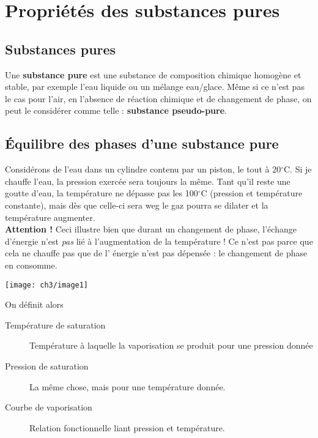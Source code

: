 \chapter{Propriétés des substances pures} 
\section{Substances pures}
Une \textbf{substance pure} est une substance de composition chimique 
homogène et stable, par exemple l'eau liquide ou un mélange eau/glace. 
Même si ce n'est pas le cas pour l'air, en l'absence de réaction 
chimique et de changement de phase, on peut le considérer comme telle 
: \textbf{substance pseudo-pure}.

\section{Équilibre des phases d'une substance pure}
Considérons de l'eau dans un cylindre contenu par un piston, le tout à 
20$^\circ$C. Si je chauffe l'eau, la pression exercée sera toujours la 
même. Tant qu'il reste une goutte d'eau, la température ne dépasse pas 
les 100$^\circ$C (pression et température constante), mais dès que 
celle-ci sera weg le gaz pourra se dilater et la température augmenter.\\

\noindent
\textbf{Attention !} Ceci illustre bien que durant un changement de 
phase, l'échange d'énergie n'est \textit{pas} lié à l'augmentation de 
la température ! Ce n'est pas parce que cela ne chauffe pas que de l'
énergie n'est pas dépensée : le changement de phase en consomme.

\begin{center}
	\texttt{[image: ch3/image1]}
\end{center}

On définit alors
\begin{description}
	\item[Température de saturation] Température à laquelle la vaporisation 
	se produit pour une pression donnée
	\item[Pression de saturation] La même chose, mais pour une température 
	donnée.
	\item[Courbe de vaporisation] Relation fonctionnelle liant pression et 
	température.
\end{description}


